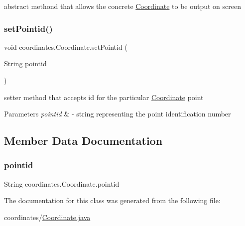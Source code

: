 abstract methond that allows the concrete \hyperlink{classcoordinates_1_1_coordinate}{Coordinate} to be output on screen 

\mbox{\label{classcoordinates_1_1_coordinate_a14f00383b5a41df79220112a12ef1cbf}} 
\subsubsection{\texorpdfstring{set\+Pointid()}{setPointid()}}
{\footnotesize\ttfamily void coordinates.\+Coordinate.\+set\+Pointid (\begin{DoxyParamCaption}\item[{String}]{pointid }\end{DoxyParamCaption})}



setter method that accepts id for the particular \hyperlink{classcoordinates_1_1_coordinate}{Coordinate} point 


\begin{DoxyParams}{Parameters}
{\em pointid} & -\/ string representing the point identification number \\
\hline
\end{DoxyParams}


\subsection{Member Data Documentation}
\mbox{\label{classcoordinates_1_1_coordinate_a871c4eb3e8771b3e59f26c8e573d6aa0}} 
\subsubsection{\texorpdfstring{pointid}{pointid}}
{\footnotesize\ttfamily String coordinates.\+Coordinate.\+pointid\hspace{0.3cm}{\ttfamily [private]}}



The documentation for this class was generated from the following file\+:\begin{DoxyCompactItemize}
\item 
coordinates/\hyperlink{_coordinate_8java}{Coordinate.\+java}\end{DoxyCompactItemize}
